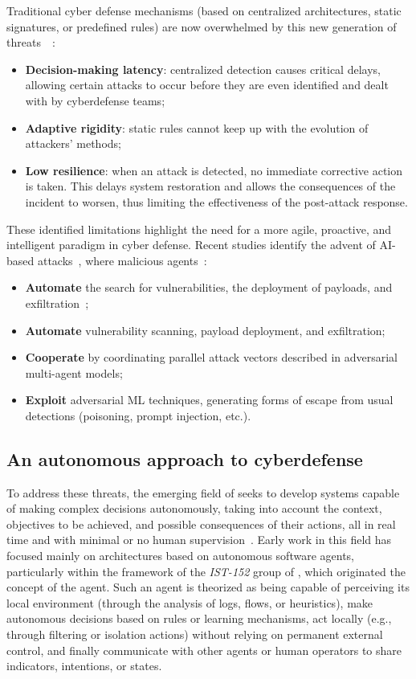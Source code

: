 Traditional cyber defense mechanisms (based on centralized architectures, static signatures, or predefined rules) are now overwhelmed by this new generation of threats~\cite{Kott2023}~:
\begin{itemize}
  \item \textbf{Decision-making latency}: centralized detection causes critical delays, allowing certain attacks to occur before they are even identified and dealt with by cyberdefense teams;
  \item \textbf{Adaptive rigidity}: static rules cannot keep up with the evolution of attackers' methods;
  \item \textbf{Low resilience}: when an attack is detected, no immediate corrective action is taken. This delays system restoration and allows the consequences of the incident to worsen, thus limiting the effectiveness of the post-attack response.
\end{itemize}

These identified limitations highlight the need for a more agile, proactive, and intelligent paradigm in cyber defense. Recent studies identify the advent of AI-based attacks~\cite{Miles2018,AutoAttacker2024,Falong2025}, where malicious agents~:
\begin{itemize}
  \item \textbf{Automate} the search for vulnerabilities, the deployment of payloads, and exfiltration~;
  \item \textbf{Automate} vulnerability scanning, payload deployment, and exfiltration;
  \item \textbf{Cooperate} by coordinating parallel attack vectors described in adversarial multi-agent models;
  \item \textbf{Exploit} adversarial ML techniques, generating forms of escape from usual detections (poisoning, prompt injection, etc.).
\end{itemize}

\subsection*{An autonomous approach to cyberdefense}

To address these threats, the emerging field of  seeks to develop systems capable of making complex decisions autonomously, taking into account the context, objectives to be achieved, and possible consequences of their actions, all in real time and with minimal or no human supervision~\cite{Vyas2023}. Early work in this field has focused mainly on architectures based on autonomous software agents, particularly within the framework of the \textit{IST-152} group of , which originated the concept of the  agent.
Such an agent is theorized as being capable of perceiving its local environment (through the analysis of logs, flows, or heuristics), make autonomous decisions based on rules or learning mechanisms, act locally (e.g., through filtering or isolation actions) without relying on permanent external control, and finally communicate with other agents or human operators to share indicators, intentions, or states.

